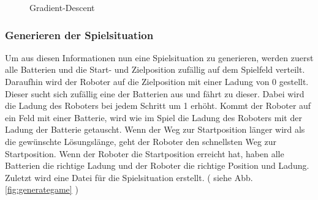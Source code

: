 \documentclass[a4paper,10pt,ngerman]{scrartcl}
\newcommand{\abbref}[1]{
  siehe Abb. \ref{#1}
}
\begin{document}
\begin{figure}[ht]
\begin{subfigure}{0.5\textwidth}
  \end{subfigure}
  \caption{Gradient-Descent}
  \label{fig:gradientdescent}
\end{figure}

\subsubsection{Generieren der Spielsituation}
Um aus diesen Informationen nun eine Spielsituation zu generieren, werden zuerst alle Batterien und die Start- und Zielposition zufällig auf dem Spielfeld verteilt.
Daraufhin wird der Roboter auf die Zielposition mit einer Ladung von 0 gestellt. Dieser sucht sich zufällig eine der Batterien aus und fährt zu dieser.
Dabei wird die Ladung des Roboters bei jedem Schritt um 1 erhöht.
Kommt der Roboter auf ein Feld mit einer Batterie, wird wie im Spiel die Ladung des Roboters mit der Ladung der Batterie getauscht.
Wenn der Weg zur Startposition länger wird als die gewünschte Lösungslänge, geht der Roboter den schnellsten Weg zur Startposition.
Wenn der Roboter die Startposition erreicht hat, haben alle Batterien die richtige Ladung und der Roboter die richtige Position und Ladung.
Zuletzt wird eine Datei für die Spielsituation erstellt. (\abbref{fig:generategame})
\end{document}
